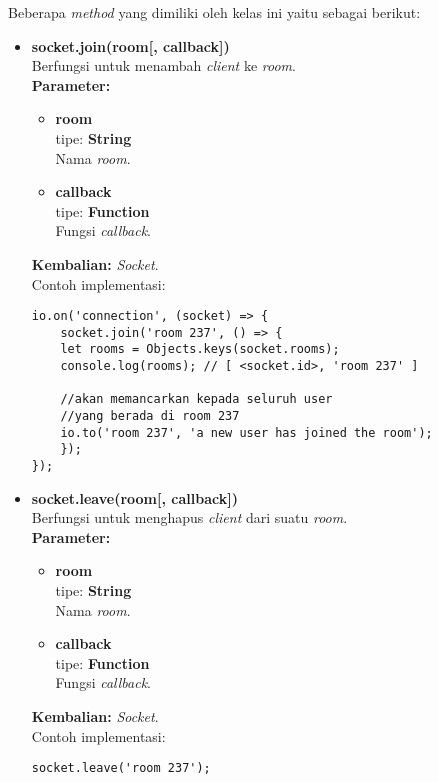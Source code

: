 \begin{enumerate}
	Beberapa \textit{method} yang dimiliki oleh kelas ini yaitu sebagai berikut:
	\begin{itemize}
		\item \textbf{socket.join(room[, callback])} \\
		Berfungsi untuk menambah \textit{client} ke \textit{room}. \\
		\textbf{Parameter:}
		\begin{itemize}
			\item \textbf{room} \\tipe: \textbf{String} \\ Nama \textit{room}.
			\item \textbf{callback} \\tipe: \textbf{Function} \\ Fungsi \textit{callback}.
		\end{itemize}
		\textbf{Kembalian:} \textit{Socket}. \\
		Contoh implementasi:
	\begin{lstlisting}
io.on('connection', (socket) => {
	socket.join('room 237', () => {
	let rooms = Objects.keys(socket.rooms);
	console.log(rooms); // [ <socket.id>, 'room 237' ]
		
	//akan memancarkan kepada seluruh user 
	//yang berada di room 237
	io.to('room 237', 'a new user has joined the room'); 
	});
});
	\end{lstlisting}
		
		\item \textbf{socket.leave(room[, callback])} \\
		Berfungsi untuk menghapus \textit{client} dari suatu \textit{room}. \\
		\textbf{Parameter:}
		\begin{itemize}
			\item \textbf{room} \\tipe: \textbf{String} \\ Nama \textit{room}.
			\item \textbf{callback} \\tipe: \textbf{Function} \\ Fungsi \textit{callback}.
		\end{itemize}
		\textbf{Kembalian:} \textit{Socket}. \\
		Contoh implementasi:
	\begin{lstlisting}
socket.leave('room 237');
	\end{lstlisting}
		
	\end{itemize}
	

\end{enumerate}
